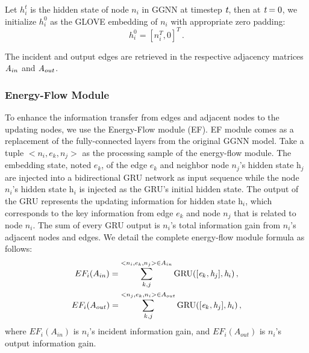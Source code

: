 \documentclass[letterpaper]{article} %
\begin{document}
Let $h_i^t$ is the hidden state of node $n_i$ in GGNN at timestep $\emph{t}$, then at $\emph{t}=0$, we initialize $h_i^0$ as the GLOVE embedding of $n_i$ with appropriate zero padding:
\begin{equation}
    h_i^0 = [n_i^T, 0]^T  \, .
\end{equation}

The incident and output edges are retrieved in the respective adjacency matrices $\emph{A}_{in}$ and $\emph{A}_{out}$. 

\medskip
\subsubsection{Energy-Flow Module}
To enhance the information transfer from edges and adjacent nodes to the updating nodes, we use the Energy-Flow module (EF).
EF module comes as a replacement of the fully-connected layers from the original GGNN model. 
Take a tuple $<{n}_i, {e}_k, {n}_j>$ as the processing sample of the energy-flow module. 
The embedding state, noted $\textit{e}_k$, of the edge ${e}_k$ and neighbor node ${n}_j$'s hidden state $\textit{h}_j$ are injected into a bidirectional GRU network as input sequence while the node ${n}_i$'s hidden state $\textit{h}_i$ is injected as the GRU's initial hidden state. 
The output of the GRU represents the updating information for hidden state $\textit{h}_i$, which corresponds to the key information from edge ${e}_k$ and node ${n}_j$ that is related to node ${n}_i$. 
The sum of every GRU output is ${n}_i$'s total information gain from ${n}_i$'s adjacent nodes and edges. 
We detail the complete energy-flow module formula as follows:
\begin{gather}\notag
    EF_i(A_{in}) = \sum\limits_{k,j}^{<n_i,e_k,n_j>\in A_{in}} \text{GRU}([\textit{e}_k, \textit{h}_j], \textit{h}_i) \, , \\ \notag
    EF_i(A_{out}) = \sum\limits_{k,j}^{<{n}_j,{e}_k,{n}_i>\in A_{out}} \text{GRU}([\textit{e}_k, \textit{h}_j], \textit{h}_i) \, ,\notag
\end{gather}
where $EF_i(A_{in})$ is ${n}_i$'s incident information gain, and $EF_i(A_{out})$ is ${n}_i$'s output information gain.
\end{document}
